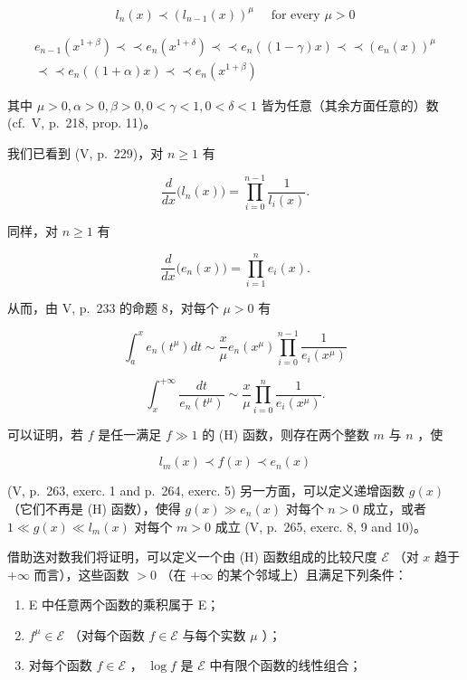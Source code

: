 \[
l _ {n} (x) \prec (l _ {n - 1} (x)) ^ {\mu} \quad \text {   for   every   } \mu > 0\tag{5}
\]

\[
\begin{array}{c} e _ {n - 1} (x ^ {1 + \beta}) \prec \prec e _ {n} (x ^ {1 + \delta}) \prec \prec e _ {n} ((1 - \gamma) x) \prec \prec (e _ {n} (x)) ^ {\mu} \\ \prec \prec e _ {n} ((1 + \alpha) x) \prec \prec e _ {n} (x ^ {1 + \beta}) \end{array}\tag{6}
\]

其中 \(\mu > 0, \alpha > 0, \beta > 0, 0 < \gamma < 1, 0 < \delta < 1\) 皆为任意（其余方面任意的）数 (cf.~V, p.~218, prop. 11)。

我们已看到 (V, p.~229)，对 \(n \geqslant 1\) 有

\[
{\frac {d}{d x}} \big (l _ {n} (x) \big) = \prod_ {i = 0} ^ {n - 1} {\frac {1}{l _ {i} (x)}}.\tag{7}
\]

同样，对 \(n\geqslant 1\) 有

\[
\frac {d}{d x} \big (e _ {n} (x) \big) = \prod_ {i = 1} ^ {n} e _ {i} (x).\tag{8}
\]

从而，由 V, p.~233 的命题 8，对每个 \(\mu > 0\) 有

\[
\int_ {a} ^ {x} e _ {n} (t ^ {\mu}) d t \sim \frac {x}{\mu} e _ {n} (x ^ {\mu}) \prod_ {i = 0} ^ {n - 1} \frac {1}{e _ {i} (x ^ {\mu})}\tag{9}
\]

\[
\int_ {x} ^ {+ \infty} \frac {d t}{e _ {n} (t ^ {\mu})} \sim \frac {x}{\mu} \prod_ {i = 0} ^ {n} \frac {1}{e _ {i} (x ^ {\mu})}.\tag{10}
\]

可以证明，若 \(f\) 是任一满足 \(f \gg 1\) 的 (H) 函数，则存在两个整数 \(m\) 与 \(n\) ，使

\[
l _ {m} (x) \prec f (x) \prec e _ {n} (x)
\]

(V, p.~263, exerc. 1 and p.~264, exerc. 5) 另一方面，可以定义递增函数 \(g(x)\) （它们不再是 (H) 函数），使得 \(g(x) \gg e_n(x)\) 对每个 \(n > 0\) 成立，或者 \(1 \ll g(x) \ll l_m(x)\) 对每个 \(m > 0\) 成立 (V, p.~265, exerc. 8, 9 and 10)。

借助迭对数我们将证明，可以定义一个由 (H) 函数组成的比较尺度 \(\mathcal{E}\) （对 \(x\) 趋于 \(+\infty\) 而言），这些函数 \(>0\) （在 \(+\infty\) 的某个邻域上）且满足下列条件：

\begin{enumerate}
\def\labelenumi{\alph{enumi})}
\item
  E 中任意两个函数的乘积属于 E；
\item
  \(f^{\mu} \in \mathcal{E}\) （对每个函数 \(f \in \mathcal{E}\) 与每个实数 \(\mu\) ）；
\item
  对每个函数 \(f \in \mathcal{E}\) ， \(\log f\) 是 \(\mathcal{E}\) 中有限个函数的线性组合；
\end{enumerate}

